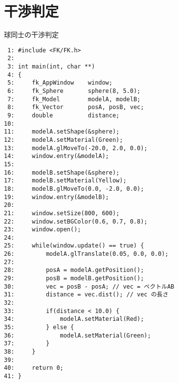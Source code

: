 \section{干渉判定} \label{sec:04-col}
\begin{itembox}[l]{球同士の干渉判定}
\begin{small}
\begin{verbatim}
 1: #include <FK/FK.h>
 2: 
 3: int main(int, char **)
 4: {
 5:     fk_AppWindow    window;
 6:     fk_Sphere       sphere(8, 5.0);
 7:     fk_Model        modelA, modelB;
 8:     fk_Vector       posA, posB, vec;
 9:     double          distance;
10: 
11:     modelA.setShape(&sphere);
12:     modelA.setMaterial(Green);
13:     modelA.glMoveTo(-20.0, 2.0, 0.0);
14:     window.entry(&modelA);
15: 
16:     modelB.setShape(&sphere);
17:     modelB.setMaterial(Yellow);
18:     modelB.glMoveTo(0.0, -2.0, 0.0);
19:     window.entry(&modelB);
20: 
21:     window.setSize(800, 600);
22:     window.setBGColor(0.6, 0.7, 0.8);
23:     window.open();
24: 
25:     while(window.update() == true) {
26:         modelA.glTranslate(0.05, 0.0, 0.0);
27: 
28:         posA = modelA.getPosition();
29:         posB = modelB.getPosition();
30:         vec = posB - posA; // vec = ベクトルAB
31:         distance = vec.dist(); // vec の長さ
32: 
33:         if(distance < 10.0) {
34:             modelA.setMaterial(Red);
35:         } else {
36:             modelA.setMaterial(Green);
37:         }
38:     }
39: 
40:     return 0;
41: }
\end{verbatim}
\end{small}
\end{itembox}

